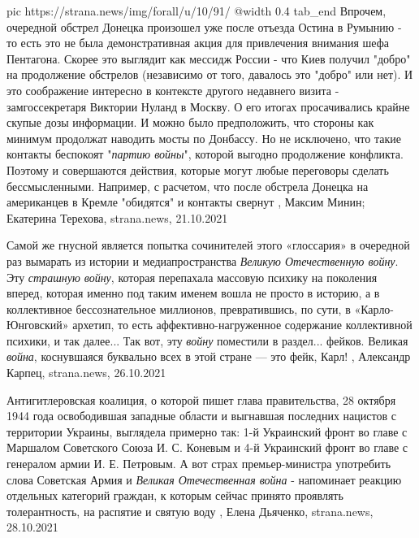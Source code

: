 	pic https://strana.news/img/forall/u/10/91/%
  @width 0.4
tab_end
\fi
Впрочем, очередной обстрел Донецка произошел уже после отъезда Остина в Румынию
- то есть это не была демонстративная акция для привлечения внимания шефа
Пентагона. Скорее это выглядит как мессидж России - что Киев получил "добро" на
продолжение обстрелов (независимо от того, давалось это "добро" или нет). 
И это соображение интересно в контексте другого недавнего визита -
замгоссекретаря Виктории Нуланд в Москву. О его итогах просачивались крайне
скупые дозы информации. И можно было предположить, что стороны как минимум
продолжат наводить мосты по Донбассу.  
Но не исключено, что такие контакты беспокоят "\emph{партию войны}", которой выгодно
продолжение конфликта. Поэтому и совершаются действия, которые могут любые
переговоры сделать бессмысленными. Например, с расчетом, что после обстрела
Донецка на американцев в Кремле "обидятся" и контакты свернут
, 
Максим Минин; Екатерина Терехова, strana.news, 21.10.2021

Самой же гнусной является попытка сочинителей этого «глоссария» в очередной раз
вымарать из истории и медиапространства \emph{Великую Отечественную войну}. Эту
\emph{страшную войну}, которая перепахала массовую психику на поколения вперед,
которая именно под таким именем вошла не просто в историю, а в коллективное
бессознательное миллионов, превратившись, по сути, в «Карло-Юнговский» архетип,
то есть аффективно-нагруженное содержание коллективной психики, и так далее...
Так вот, эту \emph{войну} поместили в раздел... фейков. Великая \emph{война}, коснувшаяся
буквально всех в этой стране — это фейк, Карл!
, 
Александр Карпец, strana.news, 26.10.2021

Антигитлеровская коалиция, о которой пишет глава правительства, 28 октября 1944
года освободившая западные области и выгнавшая последних нацистов с территории
Украины, выглядела примерно так: 1-й Украинский фронт во главе с Маршалом
Советского Союза И. С. Коневым и 4-й Украинский фронт во главе с генералом
армии И. Е. Петровым.  А вот страх премьер-министра употребить слова Советская
Армия и \emph{Великая Отечественная война} - напоминает реакцию отдельных категорий
граждан, к которым сейчас принято проявлять толерантность, на распятие и святую
воду
, 
Елена Дьяченко, strana.news, 28.10.2021
